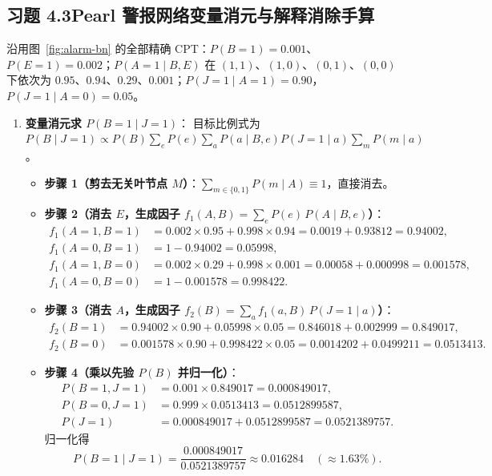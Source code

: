 \subsection*{习题 4.3\quad Pearl 警报网络变量消元与解释消除手算}
沿用图~\ref{fig:alarm-bn} 的全部精确 CPT：$P(B=1)=0.001$、$P(E=1)=0.002$；$P(A=1\mid B,E)$ 在 $(1,1)$、$(1,0)$、$(0,1)$、$(0,0)$ 下依次为 $0.95$、$0.94$、$0.29$、$0.001$；$P(J=1\mid A=1)=0.90$，$P(J=1\mid A=0)=0.05$。
\begin{enumerate}[label=(\arabic*), leftmargin=1.8em]
  \item \textbf{变量消元求 $P(B=1 \mid J=1)$}：
  目标比例式为 $P(B \mid J=1) \propto P(B)\sum_e P(e)\sum_a P(a\mid B,e) P(J=1\mid a)\sum_m P(m\mid a)$。
  \begin{itemize}
    \item \textbf{步骤 1（剪去无关叶节点 $M$）}：$\sum_{m\in\{0,1\}} P(m\mid A) \equiv 1$，直接消去。
    \item \textbf{步骤 2（消去 $E$，生成因子 $f_1(A, B) = \sum_e P(e)\, P(A\mid B, e)$）}：
    \begin{align*}
      f_1(A=1, B=1) &= 0.002 \times 0.95 + 0.998 \times 0.94 = 0.0019 + 0.93812 = 0.94002, \\
      f_1(A=0, B=1) &= 1 - 0.94002 = 0.05998, \\
      f_1(A=1, B=0) &= 0.002 \times 0.29 + 0.998 \times 0.001 = 0.00058 + 0.000998 = 0.001578, \\
      f_1(A=0, B=0) &= 1 - 0.001578 = 0.998422.
    \end{align*}
    \item \textbf{步骤 3（消去 $A$，生成因子 $f_2(B) = \sum_a f_1(a, B)\, P(J=1 \mid a)$）}：
    \begin{align*}
      f_2(B=1) &= 0.94002 \times 0.90 + 0.05998 \times 0.05 = 0.846018 + 0.002999 = 0.849017, \\
      f_2(B=0) &= 0.001578 \times 0.90 + 0.998422 \times 0.05 = 0.0014202 + 0.0499211 = 0.0513413.
    \end{align*}
    \item \textbf{步骤 4（乘以先验 $P(B)$ 并归一化）}：
    \begin{align*}
      P(B=1, J=1) &= 0.001 \times 0.849017 = 0.000849017, \\
      P(B=0, J=1) &= 0.999 \times 0.0513413 = 0.0512899587, \\
      P(J=1) &= 0.000849017 + 0.0512899587 = 0.0521389757.
    \end{align*}
    归一化得
    \[
      P(B=1 \mid J=1) = \frac{0.000849017}{0.0521389757} \approx \mathbf{0.016284} \quad (\approx 1.63\%).
\]
\end{itemize}
\end{enumerate}
